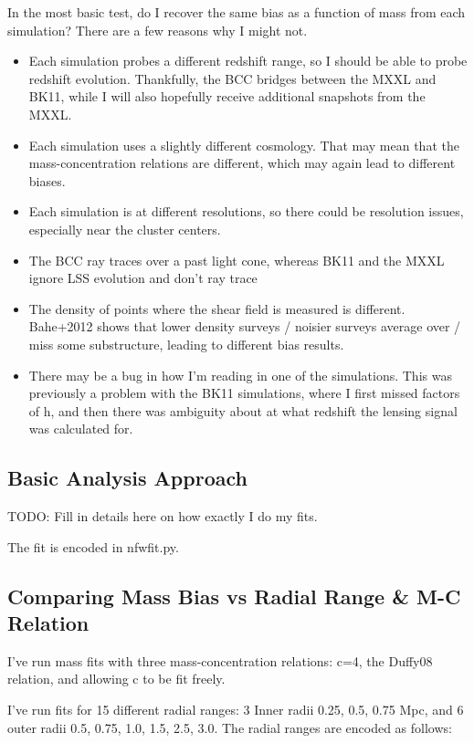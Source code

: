 \documentclass[11pt]{article}
\begin{document}
In the most basic test, do I recover the same bias as a function of mass from each simulation? There are a few reasons why I might not. 

\begin{itemize}
\item Each simulation probes a different redshift range, so I should be able to probe redshift evolution. Thankfully, the BCC bridges between the MXXL and BK11, while I will also hopefully receive additional snapshots from the MXXL. 
\item Each simulation uses a slightly different cosmology. That may mean that the mass-concentration relations are different, which may again lead to different biases. 
\item Each simulation is at different resolutions, so there could be resolution issues, especially near the cluster centers. 
\item The BCC ray traces over a past light cone, whereas BK11 and the MXXL ignore LSS evolution and don't ray trace
\item The density of points where the shear field is measured is different. Bahe+2012 shows that lower density surveys / noisier surveys average over / miss some substructure, leading to different bias results.
\item There may be a bug in how I'm reading in one of the simulations. This was previously a problem with the BK11 simulations, where I first missed factors of h, and then there was ambiguity about at what redshift the lensing signal was calculated for.
\end{itemize}

\subsection{Basic Analysis Approach}

TODO: Fill in details here on how exactly I do my fits.

The fit is encoded in nfwfit.py. 


\subsection{Comparing Mass Bias vs Radial Range \& M-C Relation}
\label{sec:consistant_bias_mcrelation}

I've run mass fits with three mass-concentration relations: c=4, the Duffy08 relation, and allowing c to be fit freely.

I've run fits for 15 different radial ranges: 3 Inner radii {0.25, 0.5, 0.75 Mpc}, and 6 outer radii {0.5, 0.75, 1.0, 1.5, 2.5, 3.0}. The radial ranges are encoded as follows:
\end{document}
